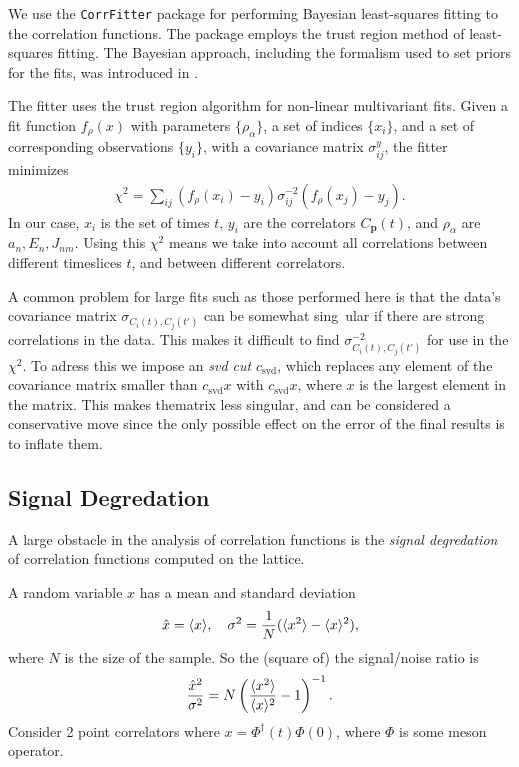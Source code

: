 We use the \texttt{CorrFitter} package \cite{CorrFitter} for performing Bayesian least-squares fitting to the correlation functions. The package employs the trust region method of least-squares fitting. The Bayesian approach, including the formalism used to set priors for the fits, was introduced in \cite{Lepage:2001ym}.

The fitter uses the trust region algorithm for non-linear multivariant fits. Given a fit function $f_{\rho}(x)$ with parameters $\{\rho_{\alpha}\}$, a set of indices $\{x_i\}$, and a set of corresponding observations $\{y_i\}$, with a covariance matrix $\sigma^y_{ij}$, the fitter minimizes
\begin{align}
  \chi^2 = \sum_{ij} ( f_{\rho}(x_i) - y_i ) \sigma_{ij}^{-2} ( f_{\rho}(x_j) - y_j ).
\end{align}
In our case, $x_i$ is the set of times $t$, $y_i$ are the correlators $C_{\textbf{p}}(t)$, and $\rho_{\alpha}$ are $a_n,E_n,J_{nm}$. Using this $\chi^2$ means we take into account all correlations between different timeslices $t$, and between different correlators.

A common problem for large fits such as those performed here is that the data’s covariance  matrix $\sigma_{C_i(t),C_j(t')}$ can be somewhat sing\
ular if there are strong correlations in the data. This makes it difficult to find $\sigma^{-2}_{C_i(t),C_j(t')}$ for use in the $\chi^2$. To adress this we impose an {\it{svd cut}} $c_{\text{svd}}$, which replaces any element of the covariance matrix smaller than $c_{\text{svd}} x$ with $c_{\text{svd}}x$, where $x$ is the largest element in the matrix. This makes thematrix less singular, and can be considered a conservative move since the only possible effect on the error of the final results is to inflate them.

\subsection{Signal Degredation}

A large obstacle in the analysis of correlation functions is the \textit{signal degredation} of correlation functions computed on the lattice.

A random variable $x$ has a mean and standard deviation
\begin{align}
  \hat{x} = \langle x \rangle,\quad
  \sigma^2 = {1\over N} ( \langle x^2 \rangle - \langle x \rangle^2 ),
\end{align}
where $N$ is the size of the sample. So the (square of) the signal/noise ratio is
\begin{align}
  {\hat{x}^2\over \sigma^2} = N \left( {\langle x^2 \rangle \over \langle x \rangle^2} - 1 \right) ^{-1}.
  \label{eq:signal-noise}
\end{align}
Consider 2 point correlators where $x = \Phi^{\dagger}(t) \Phi(0)$, where $\Phi$ is some meson operator.

